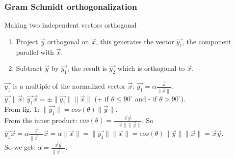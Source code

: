 \begin{frame}
	\frametitle{Gram Schmidt orthogonalization}
	\begin{block}{Making two independent vectors orthogonal}
		\begin{enumerate}
			\item Project $\overrightarrow{y}$ orthogonal on $\overrightarrow{x}$, this generates the vector $\overrightarrow{y_1}$, the component parallel with $\overrightarrow{x}$.
			\item Subtract $\overrightarrow{y}$ by $\overrightarrow{y_1}$, the result is $\overrightarrow{y_2}$ which is orthogonal to $\overrightarrow{x}$.
		\end{enumerate}
		$\overrightarrow{y_1}$ is a multiple of the normalized vector $\overrightarrow{x}$:
		$\overrightarrow{y_1}=\alpha\frac{\overrightarrow{x}}{\|\overrightarrow{x}\|}$.\\
		$\overrightarrow{y_1}\parallel\overrightarrow{x}$: $\overrightarrow{y_1}\overrightarrow{x}=\pm\|\overrightarrow{y_1}\|\|\overrightarrow{x}\|$ (+ if $\theta\leq90^{\circ}$ and - if $\theta>90^{\circ}$).\\
		From fig. 1: $\|\overrightarrow{y_1}\|=cos(\theta)\|\overrightarrow{y}\|$.\\
		From the inner product: $cos(\theta)=\frac{\overrightarrow{x}\overrightarrow{y}}{\|\overrightarrow{x}\|\|\overrightarrow{y}\|}$.
		So $\overrightarrow{y_1}\overrightarrow{x}=\alpha\frac{\overrightarrow{x}}{\|\overrightarrow{x}\|}\overrightarrow{x}=\alpha\|\overrightarrow{x}\|=\|\overrightarrow{y_1}\|\|\overrightarrow{x}\|=cos(\theta)\|\overrightarrow{y}\|\|\overrightarrow{x}\|=\overrightarrow{x}\overrightarrow{y}$.\\
		So we get: $\alpha=\frac{\overrightarrow{x}\overrightarrow{y}}{\|\overrightarrow{x}\|}$.
	\end{block} 
\end{frame}

